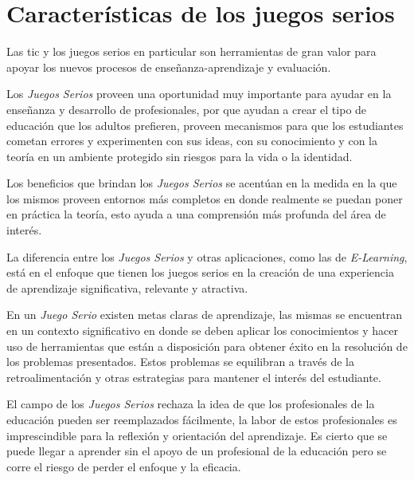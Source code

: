 \section{Características de los juegos serios}

Las \Gls{tic} y los juegos serios en particular son herramientas de gran valor
para apoyar los nuevos procesos de enseñanza-aprendizaje y
evaluación\cite{guenaga2013serious}.


Los \emph{Juegos Serios} proveen una oportunidad muy importante para ayudar en
la enseñanza y desarrollo de profesionales\cite{mariluz:seiousgames}, por que
ayudan a crear el tipo de educación que los adultos prefieren, proveen
mecanismos para que los estudiantes cometan errores y experimenten con sus
ideas, con su conocimiento y con la teoría en un ambiente protegido sin riesgos
para la vida o la identidad\cite{sg:aoverview,education:games}. 

Los beneficios que brindan los \emph{Juegos Serios} se acentúan en la medida en
la que los mismos proveen entornos más completos en donde realmente se puedan
poner en práctica la teoría, esto ayuda a una comprensión más profunda del área
de interés\cite{sg:aoverview}.

La diferencia entre los \emph{Juegos Serios} y otras aplicaciones, como las de
\emph{E-Learning}, está en el enfoque que tienen los juegos serios en la creación
de una experiencia de aprendizaje significativa, relevante y
atractiva\cite{sg:aoverview}.

En un \emph{Juego Serio} existen metas claras de aprendizaje, las mismas se
encuentran en un contexto significativo en donde se deben aplicar los
conocimientos y hacer uso de herramientas que están a disposición para obtener
éxito en la resolución de los problemas presentados. Estos problemas se
equilibran a través de la retroalimentación y otras estrategias para mantener el
interés del estudiante\cite{sg:aoverview}.

El campo de los \emph{Juegos Serios} rechaza la idea de que los profesionales de
la educación pueden ser reemplazados fácilmente, la labor de estos profesionales
es imprescindible para la reflexión y orientación del
aprendizaje\cite{elearning:seiousgames}. Es cierto que se puede llegar a
aprender sin el apoyo de un profesional de la educación pero se corre el riesgo
de perder el enfoque y la eficacia\cite{elearning:seiousgames}. 

